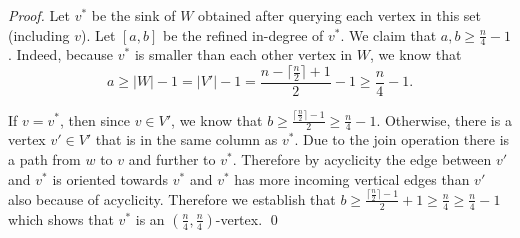 \documentclass[runningheads,a4paper]{llncs}
\newcommand{\indegree}{refined in-degree\xspace}
\newcommand{\join}{\mbox{join}\xspace}
\begin{document}
\begin{proof}
Let $v^*$ be the sink of $W$ obtained after querying each vertex in this set (including $v$). Let $[a,b]$ be the \indegree of $v^*$. We claim that $a, b \geq \frac{n}{4} - 1$. 
Indeed, because $v^*$ is smaller than each other vertex in $W$, we know that $$a \geq |W|-1 = |V'|-1 = \frac{n-\lceil \frac{n}{2}\rceil + 1}{2} - 1 \geq \frac{n}{4} - 1.$$


If $v = v^*$, then since $v\in V'$, we know that $b\geq \frac{\lceil \frac{n}{2}\rceil-1}{2}\geq \frac{n}{4} - 1$.
Otherwise, there is a vertex $v' \in V'$ that is in the same column as $v^*$. Due to the \join operation there is a path from $w$ to $v$ and further to $v^*$. Therefore by acyclicity the edge between $v'$ and $v^*$ is oriented towards $v^*$ and $v^*$ has more incoming vertical edges than $v'$ also because of acyclicity. Therefore we establish that $b \geq \frac{\lceil \frac{n}{2}\rceil-1}{2} + 1 \geq \frac{n}{4} \geq \frac{n}{4} - 1$ which shows that $v^*$ is an $(\frac{n}{4}, \frac{n}{4})$-vertex. \qed

   

\end{proof}
\end{document}
